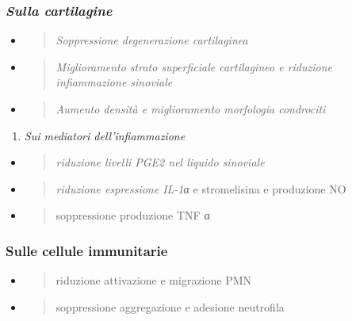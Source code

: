 \documentclass[]{article}
\begin{document}
\subsubsection{\texorpdfstring{\emph{Sulla
cartilagine}}{Sulla cartilagine}}\label{sulla-cartilagine}

\begin{itemize}
\item
  \begin{quote}
  \emph{Soppressione degenerazione cartilaginea}
  \end{quote}
\item
  \begin{quote}
  \emph{Miglioramento strato superficiale cartilagineo e riduzione
  infiammazione sinoviale}
  \end{quote}
\item
  \begin{quote}
  \emph{Aumento densità e miglioramento morfologia condrociti}
  \end{quote}
\end{itemize}

\begin{enumerate}
\def\labelenumi{\arabic{enumi})}
\item
  \emph{Sui mediatori dell'infiammazione}
\end{enumerate}

\begin{itemize}
\item
  \begin{quote}
  \emph{riduzione livelli PGE2 nel liquido sinoviale}
  \end{quote}
\item
  \begin{quote}
  \emph{riduzione espressione IL-1α} e stromelisina e produzione NO
  \end{quote}
\item
  \begin{quote}
  soppressione produzione TNF α
  \end{quote}
\end{itemize}

\subsubsection{Sulle cellule
immunitarie}\label{sulle-cellule-immunitarie}

\begin{itemize}
\item
  \begin{quote}
  riduzione attivazione e migrazione PMN
  \end{quote}
\item
  \begin{quote}
  soppressione aggregazione e adesione neutrofila
  \end{quote}
\end{itemize}
\end{document}

